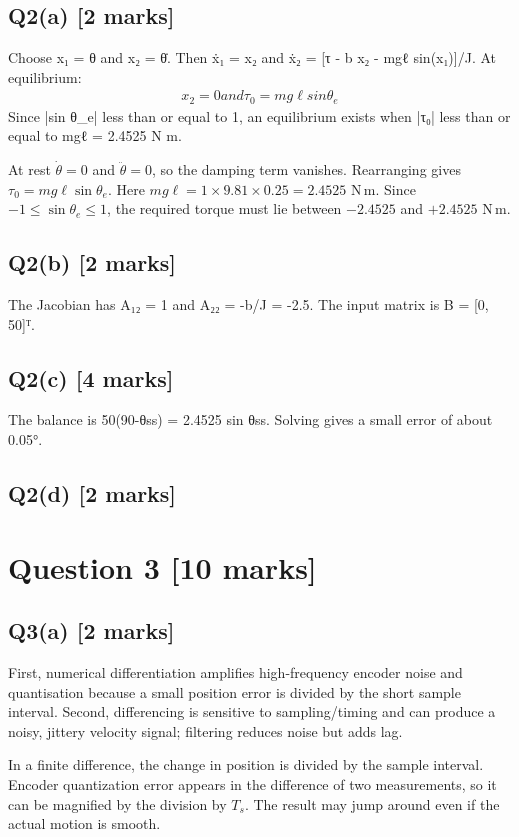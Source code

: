 \documentclass[11pt,a4paper]{article}
\begin{document}
\subsection*{Q2(a) \hfill [2 marks]}

Choose x₁ = θ and x₂ = θ̇.
Then ẋ₁ = x₂ and ẋ₂ = [τ - b x₂ - mgℓ sin(x₁)]/J.
At equilibrium:\[\begin{aligned}x_2 = 0 and τ_0 = mg\ell sin \theta_e\end{aligned}\]
Since |sin θ\_e| less than or equal to 1, an equilibrium exists when |τ₀| less than or equal to mgℓ = 2.4525 N m.\par\smallskip At rest $\dot\theta=0$ and $\ddot\theta=0$, so the damping term vanishes. Rearranging gives $\tau_0=mg\ell\sin\theta_e$. Here $mg\ell=1\times9.81\times0.25=2.4525$ N\,m. Since $-1\leq\sin\theta_e\leq1$, the required torque must lie between $-2.4525$ and $+2.4525$ N\,m.

\subsection*{Q2(b) \hfill [2 marks]}

The Jacobian has A₁₂ = 1 and A₂₂ = -b/J = -2.5.
The input matrix is B = [0, 50]ᵀ.

\subsection*{Q2(c) \hfill [4 marks]}

The balance is 50(90-θss) = 2.4525 sin θss.
Solving gives a small error of about 0.05°.

\subsection*{Q2(d) \hfill [2 marks]}

\vspace{2mm}

\section*{Question 3 \hfill [10 marks]}
\subsection*{Q3(a) \hfill [2 marks]}

First, numerical differentiation amplifies high-frequency encoder noise and quantisation because a small position error is divided by the short sample interval.
Second, differencing is sensitive to sampling/timing and can produce a noisy, jittery velocity signal; filtering reduces noise but adds lag.\par\smallskip In a finite difference, the change in position is divided by the sample interval. Encoder quantization error appears in the difference of two measurements, so it can be magnified by the division by $T_s$. The result may jump around even if the actual motion is smooth.
\end{document}
